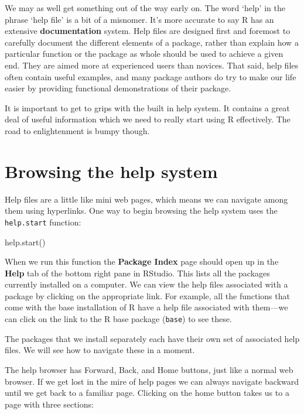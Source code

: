 \documentclass[
]{book}
\newenvironment{Shaded}{\begin{snugshade}}{\end{snugshade}}
\newcommand{\FunctionTok}[1]{\textcolor[rgb]{0.00,0.00,0.00}{#1}}
\newcommand{\NormalTok}[1]{#1}
\begin{document}
We may as well get something out of the way early on. The word `help' in the phrase `help file' is a bit of a misnomer. It's more accurate to say R has an extensive \textbf{documentation} system. Help files are designed first and foremost to carefully document the different elements of a package, rather than explain how a particular function or the package as whole should be used to achieve a given end. They are aimed more at experienced users than novices. That said, help files often contain useful examples, and many package authors do try to make our life easier by providing functional demonstrations of their package.

It is important to get to grips with the built in help system. It contains a great deal of useful information which we need to really start using R effectively. The road to enlightenment is bumpy though.

\hypertarget{browsing-the-help-system}{%
\section{Browsing the help system}\label{browsing-the-help-system}}

Help files are a little like mini web pages, which means we can navigate among them using hyperlinks. One way to begin browsing the help system uses the \texttt{help.start} function:

\begin{Shaded}
\begin{Highlighting}[]
\FunctionTok{help.start}\NormalTok{() }
\end{Highlighting}
\end{Shaded}

When we run this function the \textbf{Package Index} page should open up in the \textbf{Help} tab of the bottom right pane in RStudio. This lists all the packages currently installed on a computer. We can view the help files associated with a package by clicking on the appropriate link. For example, all the functions that come with the base installation of R have a help file associated with them---we can click on the link to the R base package (\texttt{base}) to see these.

The packages that we install separately each have their own set of associated help files. We will see how to navigate these in a moment.

The help browser has Forward, Back, and Home buttons, just like a normal web browser. If we get lost in the mire of help pages we can always navigate backward until we get back to a familiar page. Clicking on the home button takes us to a page with three sections:
\end{document}
